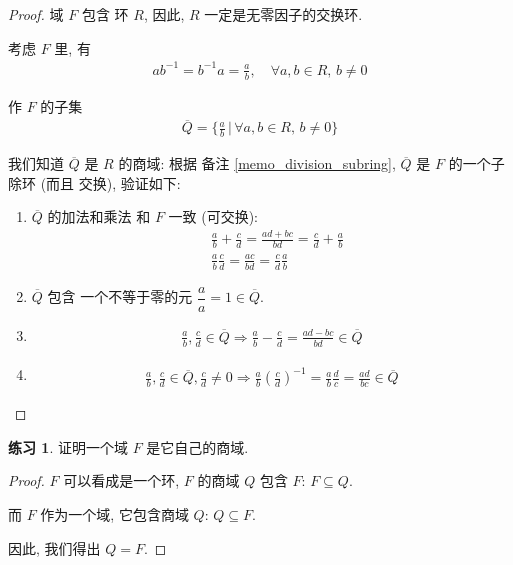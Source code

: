 \documentclass[utf8]{ctexbook}
\theoremstyle{definition}
\newtheorem{exercise}{练习}[section]
\begin{document}
\begin{proof}
域 $F$ 包含 环 $R$, 因此, $R$ 一定是无零因子的交换环.

考虑 $F$ 里, 有
\begin{align*}
a b^{-1} = b^{-1} a = \frac{a}{b} , \quad \forall a , b \in R, \, b \neq 0
\end{align*}

作 $F$ 的子集
\begin{align*}
\overline{Q} = \{ \frac{a}{b} \, | \,  \forall a , b \in R, \, b \neq 0 \}
\end{align*}

我们知道 $\overline{Q}$ 是 $R$ 的商域: 根据 备注 \ref{memo_division_subring}, $\overline{Q}$ 是 $F$ 的一个子除环 (而且 交换), 验证如下:
\begin{enumerate}
\item{$\overline{Q}$ 的加法和乘法 和 $F$ 一致 (可交换):
\begin{align*}
& \frac{a}{b} + \frac{c}{d} = \frac{ad + bc}{bd} =  \frac{c}{d} + \frac{a}{b}\\
& \frac{a}{b} \frac{c}{d} = \frac{ac}{bd} = \frac{c}{d} \frac{a}{b}
\end{align*}
}
\item{$\overline{Q}$ 包含 一个不等于零的元 $\dfrac{a}{a} = 1 \in \overline{Q}$.}
\item{
\begin{align*}
\frac{a}{b}, \frac{c}{d} \in \overline{Q} \Longrightarrow \frac{a}{b} - \frac{c}{d} = \frac{ad - bc}{bd} \in \overline{Q}
\end{align*}
}
\item{
\begin{align*}
\frac{a}{b}, \frac{c}{d} \in \overline{Q} , \frac{c}{d} \neq 0 \Longrightarrow \frac{a}{b} \left( \frac{c}{d} \right)^{-1} = \frac{a}{b} \frac{d}{c} = \frac{a d}{b c} \in \overline{Q} 
\end{align*}
}
\end{enumerate}
\end{proof}

\begin{exercise}
证明一个域 $F$ 是它自己的商域.
\end{exercise}


\begin{proof}
$F$ 可以看成是一个环, $F$ 的商域 $Q$ 包含 $F$: $F \subseteq Q$. 

而 $F$ 作为一个域, 它包含商域 $Q$: $Q \subseteq F$.

因此, 我们得出 $Q = F$.
\end{proof}
\end{document}
